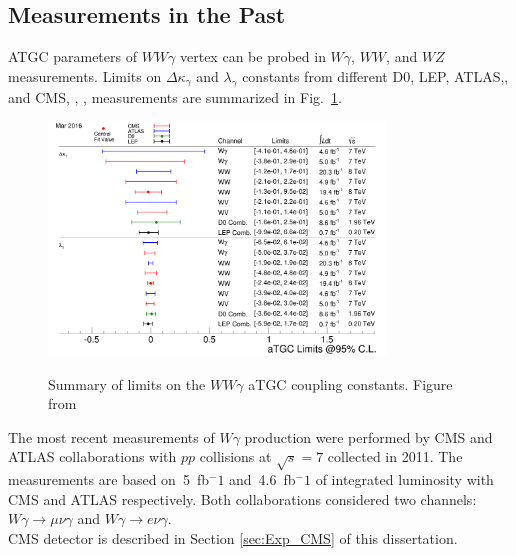 \subsection{Measurements in the Past}

ATGC parameters of $WW\gamma$ vertex can be probed in $W\gamma$, $WW$, and $WZ$ measurements. Limits on $\Delta \kappa_\gamma$ and $\lambda_\gamma$ constants from different D0\cite{ref_D0_aTGC_comb}, LEP\cite{ref_LEP_aTGC_comb}, ATLAS\cite{ref_7TeV_ATLAS},\cite{ref_ATLAS_WW_8TeV}, \cite{ref_ATLAS_VW_8TeV} and CMS\cite{ref_7TeV_CMS}, \cite{ref_CMS_WW_7TeV}, \cite{ref_CMS_WW_8TeV}, \cite{ref_CMS_VW_7TeV} measurements are summarized in Fig.~\ref{fig:aTGC_cg}.\\ 

\begin{figure}[htb]
  \begin{center}
    {\includegraphics[width=0.80\textwidth]{../figs/WgAbout/aTGC_cg.png}}
    \caption{Summary of limits on the $WW\gamma$ aTGC coupling constants. Figure from \cite{ref_twiki_SMP_ATGC}}
    \label{fig:aTGC_cg}
  \end{center}
\end{figure}


The most recent measurements of $W\gamma$ production were performed by CMS \cite{ref_7TeV_CMS} and ATLAS \cite{ref_7TeV_ATLAS} collaborations with $pp$ collisions at $\sqrt{s}=7$ collected in 2011. The measurements are based on~5~fb$^-1$ and~4.6~fb$^-1$ of integrated luminosity with CMS and ATLAS respectively. Both collaborations considered two channels: $W\gamma\rightarrow\mu\nu\gamma$ and $W\gamma\rightarrow e\nu\gamma$.\\

CMS detector is described in Section \ref{sec:Exp_CMS} of this dissertation.\\

